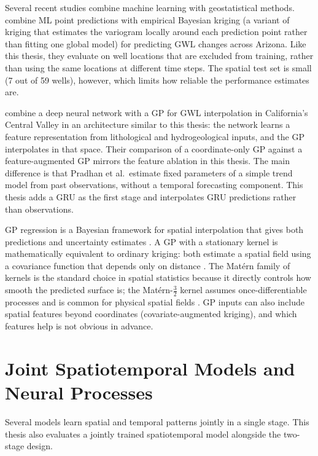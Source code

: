 Several recent studies combine machine learning with geostatistical methods. \citet{zowam2024} combine ML point predictions with empirical Bayesian kriging (a variant of kriging that estimates the variogram locally around each prediction point rather than fitting one global model) for predicting GWL changes across Arizona. Like this thesis, they evaluate on well locations that are excluded from training, rather than using the same locations at different time steps. The spatial test set is small (7 out of 59 wells), however, which limits how reliable the performance estimates are.

\citet{pradhan2024modeling} combine a deep neural network with a GP for GWL interpolation in California's Central Valley in an architecture similar to this thesis: the network learns a feature representation from lithological and hydrogeological inputs, and the GP interpolates in that space. Their comparison of a coordinate-only GP against a feature-augmented GP mirrors the feature ablation in this thesis. The main difference is that Pradhan et al.\ estimate fixed parameters of a simple trend model from past observations, without a temporal forecasting component. This thesis adds a GRU as the first stage and interpolates GRU predictions rather than observations.

GP regression is a Bayesian framework for spatial interpolation that gives both predictions and uncertainty estimates \citep{rasmussen2006gaussian}. A GP with a stationary kernel is mathematically equivalent to ordinary kriging: both estimate a spatial field using a covariance function that depends only on distance \citep{rasmussen2006gaussian}. The Matérn family of kernels is the standard choice in spatial statistics because it directly controls how smooth the predicted surface is; the Matérn-$\tfrac{3}{2}$ kernel assumes once-differentiable processes and is common for physical spatial fields \citep{rasmussen2006gaussian}. GP inputs can also include spatial features beyond coordinates (covariate-augmented kriging), and which features help is not obvious in advance.

\section{Joint Spatiotemporal Models and Neural Processes}
\label{sec:rw_joint}

Several models learn spatial and temporal patterns jointly in a single stage. This thesis also evaluates a jointly trained spatiotemporal model alongside the two-stage design.

